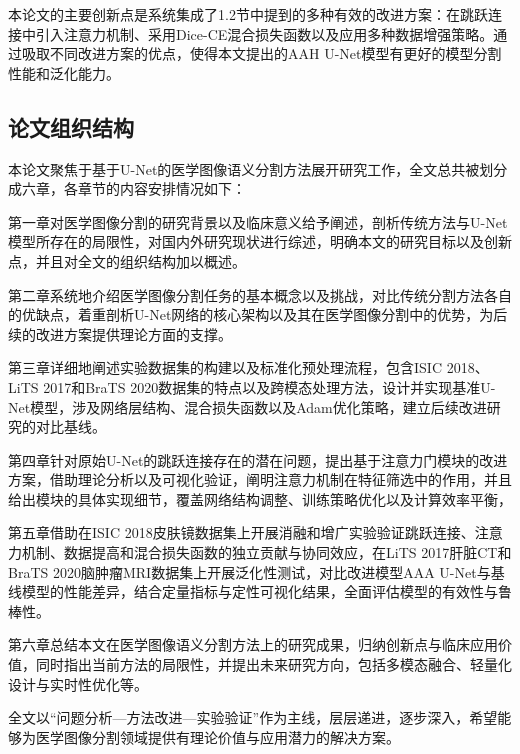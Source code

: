 本论文的主要创新点是系统集成了1.2节中提到的多种有效的改进方案：在跳跃连接中引入注意力机制、采用Dice-CE混合损失函数以及应用多种数据增强策略。通过吸取不同改进方案的优点，使得本文提出的AAH U-Net模型有更好的模型分割性能和泛化能力。

\subsection{论文组织结构}

本论文聚焦于基于U-Net的医学图像语义分割方法展开研究工作，全文总共被划分成六章，各章节的内容安排情况如下：

第一章对医学图像分割的研究背景以及临床意义给予阐述，剖析传统方法与U-Net模型所存在的局限性，对国内外研究现状进行综述，明确本文的研究目标以及创新点，并且对全文的组织结构加以概述。

第二章系统地介绍医学图像分割任务的基本概念以及挑战，对比传统分割方法各自的优缺点，着重剖析U-Net网络的核心架构以及其在医学图像分割中的优势，为后续的改进方案提供理论方面的支撑。

第三章详细地阐述实验数据集的构建以及标准化预处理流程，包含ISIC 2018、LiTS 2017和BraTS 2020数据集的特点以及跨模态处理方法，设计并实现基准U-Net模型，涉及网络层结构、混合损失函数以及Adam优化策略，建立后续改进研究的对比基线。

第四章针对原始U-Net的跳跃连接存在的潜在问题，提出基于注意力门模块的改进方案，借助理论分析以及可视化验证，阐明注意力机制在特征筛选中的作用，并且给出模块的具体实现细节，覆盖网络结构调整、训练策略优化以及计算效率平衡，

第五章借助在ISIC 2018皮肤镜数据集上开展消融和增广实验验证跳跃连接、注意力机制、数据提高和混合损失函数的独立贡献与协同效应，在LiTS 2017肝脏CT和BraTS 2020脑肿瘤MRI数据集上开展泛化性测试，对比改进模型AAA U-Net与基线模型的性能差异，结合定量指标与定性可视化结果，全面评估模型的有效性与鲁棒性。

第六章总结本文在医学图像语义分割方法上的研究成果，归纳创新点与临床应用价值，同时指出当前方法的局限性，并提出未来研究方向，包括多模态融合、轻量化设计与实时性优化等。

全文以“问题分析—方法改进—实验验证”作为主线，层层递进，逐步深入，希望能够为医学图像分割领域提供有理论价值与应用潜力的解决方案。